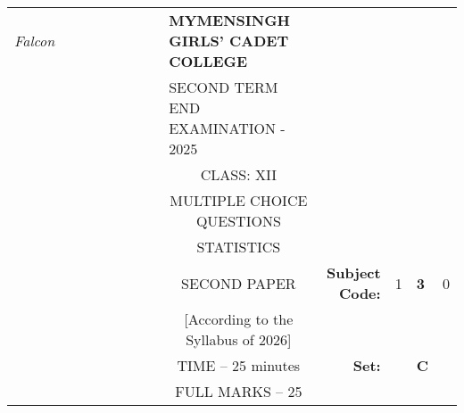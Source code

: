 \documentclass[12pt]{exam}
\begin{document}
\begin{table}[]
\begin{tabular}{llllllllcllll}
\textit{Falcon} &  &  &  &  &  &  &  & \multicolumn{1}{l}{\textbf{MYMENSINGH GIRLS' CADET COLLEGE}} &                                             &                        &                                 &                        \\
                &  &  &  &  &  &  &  & \multicolumn{1}{l}{SECOND TERM END EXAMINATION - 2025}       &                                             &                        & \multicolumn{1}{c}{}            &                        \\
                &  &  &  &  &  &  &  & CLASS: XII                                                   &                                             &                        & \multicolumn{1}{c}{}            &                        \\
                &  &  &  &  &  &  &  & MULTIPLE CHOICE QUESTIONS                                    &                                             &                        & \multicolumn{1}{c}{}            &                        \\
                &  &  &  &  &  &  &  & STATISTICS                                                   &                                             &                        & \multicolumn{1}{r}{}            &                        \\ \cline{11-13} 
                &  &  &  &  &  &  &  & SECOND PAPER                                                 & \multicolumn{1}{r|}{\textbf{Subject Code:}} & \multicolumn{1}{l|}{1} & \multicolumn{1}{l|}{\textbf{3}} & \multicolumn{1}{l|}{0} \\ \cline{11-13} 
                &  &  &  &  &  &  &  & [According to the Syllabus of 2026]                          & \multicolumn{1}{r}{}                        &                        &                                 &                        \\ \cline{12-12}
                &  &  &  &  &  &  &  & TIME – 25 minutes                                            & \multicolumn{1}{r}{\textbf{Set:}}           & \multicolumn{1}{l|}{}  & \multicolumn{1}{l|}{\textbf{C}} &                        \\ \cline{12-12}
                &  &  &  &  &  &  &  & FULL MARKS – 25                                              &                                             &                        &                                 &                       
\end{tabular}
\end{table}
\end{document}
